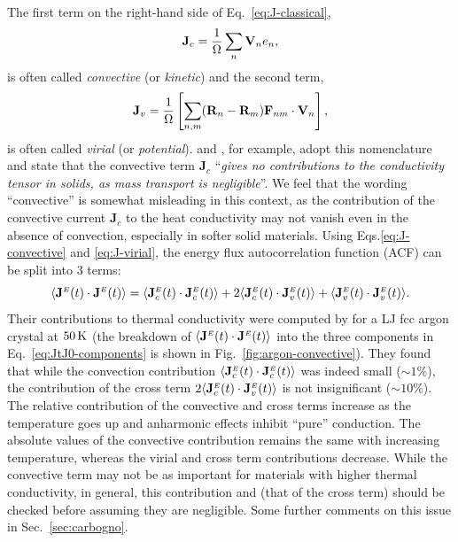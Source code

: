 \begin{LEtext}
The first term on the right-hand side of Eq.~\eqref{eq:J-classical},
\begin{equation}
    \mathbf{J}_c = \frac{1}{\rOmega} \sum_n \mathbf{V}_n e_n , \label{eq:J-convective}
\end{equation}
is often called \emph{convective} (or \emph{kinetic}) and the second term,
\begin{equation}
    \mathbf{J}_v = \frac{1}{\rOmega} \left[ \sum_{n,m} (\mathbf{R}_n-\mathbf{R}_m) \mathbf{F}_{n m} \cdot \mathbf{V}_n \right], \label{eq:J-virial}
\end{equation}
is often called \emph{virial} (or \emph{potential}).
\citet{Fan2015} and \citet{Carbogno:2017gc}, for example, adopt this nomenclature and state that the convective term $\mathbf{J}_c$ ``\emph{gives no contributions to the conductivity tensor in solids, as mass transport is negligible}''.
We feel that the wording ``convective'' is somewhat misleading in this context, as the contribution of the convective current $\mathbf{J}_c$ to the heat conductivity may not vanish even in the absence of convection, especially in softer solid materials. 
Using Eqs.\eqref{eq:J-convective} and \eqref{eq:J-virial}, the energy flux autocorrelation function (ACF) can be split into 3 terms:
\begin{equation}
    \langle\mathbf{J}^\smallE(t)\cdot\mathbf{J}^\smallE(t)\rangle = \langle\mathbf{J}_c^\smallE(t)\cdot\mathbf{J}_c^\smallE(t)\rangle + 
    2\langle\mathbf{J}_c^\smallE(t)\cdot\mathbf{J}_v^\smallE(t)\rangle + 
    \langle\mathbf{J}_v^\smallE(t)\cdot\mathbf{J}_v^\smallE(t)\rangle . \label{eq:JtJ0-components}
\end{equation}
Their contributions to thermal conductivity were computed by \citet{McGaughey2006} for a LJ fcc argon crystal at $50\,\mathrm{K}$ (the breakdown of $\langle\mathbf{J}^{\scriptscriptstyle E}(t)\cdot\mathbf{J}^{\scriptscriptstyle E}(t)\rangle$ into the three components in Eq.~\eqref{eq:JtJ0-components} is shown in Fig.~\ref{fig:argon-convective}). They found that while the convection contribution $\langle\mathbf{J}_c^{\scriptscriptstyle E}(t)\cdot\mathbf{J}_c^{\scriptscriptstyle E}(t)\rangle$ was indeed small ($\sim 1\%$), the contribution of the cross term $2\langle\mathbf{J}_c^{\scriptscriptstyle E}(t)\cdot\mathbf{J}_v^{\scriptscriptstyle E}(t)\rangle$ is not insignificant ($\sim 10\%$). The relative contribution of the convective and cross terms increase as the temperature goes up and anharmonic effects inhibit ``pure'' conduction. The absolute values of the convective contribution remains the same with increasing temperature, whereas the virial and cross term contributions decrease. While the convective term may not be as important for materials with higher thermal conductivity, in general, this contribution and (that of the cross term) should be checked before assuming they are negligible. Some further comments on this issue in Sec.~\ref{sec:carbogno}.


\end{LEtext}
